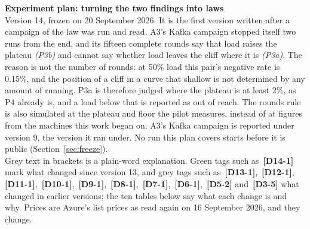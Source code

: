 \documentclass[11pt]{article}
\newcommand{\gl}[1]{{\color{soft}\itshape\small (#1)}}
\newcommand{\chg}[1]{\,{\color{chgcol}\bfseries\footnotesize[#1]}}
\newcommand{\chgold}[1]{\,{\color{oldcol}\bfseries\footnotesize[#1]}}
\begin{document}
{\LARGE\bfseries Experiment plan: turning the two findings into laws}\\[3pt]
{\large Version 14, frozen on 20 September 2026. It is the first version written after a campaign of the law was run and read. A3's Kafka campaign stopped itself two runs from the end, and its fifteen complete rounds say that load raises the plateau \gl{P3b} and cannot say whether load leaves the cliff where it is \gl{P3a}. The reason is not the number of rounds: at 50\% load this pair's negative rate is 0.15\%, and the position of a cliff in a curve that shallow is not determined by any amount of running. P3a is therefore judged where the plateau is at least 2\%, as P4 already is, and a load below that is reported as out of reach. The rounds rule is also simulated at the plateau and floor the pilot measures, instead of at figures from the machines this work began on. A3's Kafka campaign is reported under version 9, the version it ran under. No run this plan covers starts before it is public (Section~\ref{sec:freeze}).}\\[2pt]
{\color{soft}\small Grey text in brackets is a plain-word explanation. Green tags such as \chg{D14-1} mark what changed since version 13, and grey tags such as \chgold{D13-1}, \chgold{D12-1}, \chgold{D11-1}, \chgold{D10-1}, \chgold{D9-1}, \chgold{D8-1}, \chgold{D7-1}, \chgold{D6-1}, \chgold{D5-2} and \chgold{D3-5} what changed in earlier versions; the ten tables below say what each change is and why. Prices are Azure's list prices as read again on 16 September 2026, and they change.}
\end{document}
